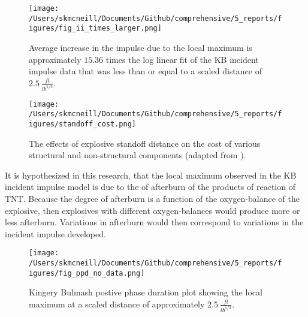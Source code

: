 \begin{figure}[tb]
  \begin{center}
   \texttt{[image: /Users/skmcneill/Documents/Github/comprehensive/5\_reports/figures/fig\_ii\_times\_larger.png]}
  \end{center}
  \caption{Average increase in the impulse due to the local maximum is approximately $15.36$ times the log linear fit of the KB incident impulse data that was less than or equal to a scaled distance of $2.5\:\frac{ft}{lb^{1/3}}$.}
\label{fig:KB_avg_inc}
\end{figure}%

\begin{figure}[tb]
  \begin{center}
   \texttt{[image: /Users/skmcneill/Documents/Github/comprehensive/5\_reports/figures/standoff\_cost.png]}
  \end{center}
  \caption{The effects of explosive standoff distance on the cost of various structural and non-structural components (adapted from \citep{Smith2016}).}
\label{fig:KB_cost}
\end{figure}%

It is hypothesized in this research, that the local maximum observed in the KB incident impulse model is due to the of afterburn of the products of reaction of TNT.  Because the degree of afterburn is a function of the oxygen-balance of the explosive, then explosives with different oxygen-balances would produce more or less afterburn.  Variations in afterburn would then correspond to variations in the incident impulse developed.
  
  
\begin{figure}[tb]
  \begin{center}
   \texttt{[image: /Users/skmcneill/Documents/Github/comprehensive/5\_reports/figures/fig\_ppd\_no\_data.png]}
  \end{center}
  \caption{Kingery Bulmash postive phase duration plot showing the local maximum at a scaled distance of approximately $2.5\:\frac{ft}{lb^{1/3}}$\citep{Kingery1984}.}
\label{fig:KB_ppd}
\end{figure}%

